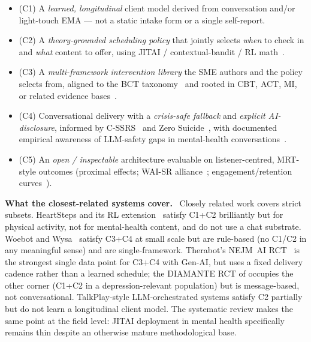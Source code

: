 \documentclass[10pt,conference]{article}
\renewcommand{\paragraph}[1]{\smallskip\par\noindent\textbf{#1}~\ignorespaces}
\begin{document}
\begin{itemize}\setlength{\itemsep}{0pt}
  \item (C1) A \emph{learned, longitudinal} client model derived from
    conversation and/or light-touch EMA --- not a static intake form
    or a single self-report.
  \item (C2) A \emph{theory-grounded scheduling policy} that jointly
    selects \emph{when} to check in and \emph{what} content to offer,
    using JITAI / contextual-bandit / RL
    math~\cite{NahumShani2018JITAI,Klasnja2015MRT,Liao2020PersonalizedHeartSteps}.
  \item (C3) A \emph{multi-framework intervention library} the SME
    authors and the policy selects from, aligned to the BCT
    taxonomy~\cite{Michie2013BCTTaxonomy} and rooted in CBT, ACT, MI,
    or related evidence
    bases~\cite{Hofmann2012CBTMeta,ATjak2015ACTMeta,Lundahl2010MIMeta}.
  \item (C4) Conversational delivery with a \emph{crisis-safe
    fallback} and \emph{explicit AI-disclosure}, informed by
    C-SSRS~\cite{Posner2011CSSRS} and Zero
    Suicide~\cite{Labouliere2018ZeroSuicide}, with documented
    empirical awareness of LLM-safety gaps in mental-health
    conversations~\cite{DeFreitas2024ChatbotSafety,Scholich2025TherapistVsChatbot,Parks2025CriticalEval}.
  \item (C5) An \emph{open / inspectable} architecture evaluable on
    listener-centred, MRT-style outcomes (proximal effects; WAI-SR
    alliance~\cite{Hatcher2006WAISR}; engagement/retention
    curves~\cite{Linardon2020Attrition}).
\end{itemize}

\paragraph{What the closest-related systems cover.}
Closely related work covers strict subsets. HeartSteps and its
RL extension~\cite{Klasnja2018HeartStepsMRT,Liao2020PersonalizedHeartSteps}
satisfy C1+C2 brilliantly but for physical activity, not for
mental-health content, and do not use a chat substrate. Woebot and
Wysa~\cite{Fitzpatrick2017Woebot,Inkster2018Wysa} satisfy C3+C4 at
small scale but are rule-based (no C1/C2 in any meaningful sense)
and are single-framework. Therabot's NEJM~AI
RCT~\cite{Heinz2025TherabotRCT} is the strongest single data point for
C3+C4 with Gen-AI, but uses a fixed delivery cadence rather than a
learned schedule; the DIAMANTE RCT of \cite{Aguilera2024DIAMANTERL}
occupies the other corner (C1+C2 in a depression-relevant population)
but is message-based, not conversational. TalkPlay-style
LLM-orchestrated systems satisfy C2 partially but do not learn a
longitudinal client model. The
\cite{NahumShani2025JITAIMHReview} systematic review makes the same
point at the field level: JITAI deployment in mental health specifically
remains thin despite an otherwise mature methodological base.
\end{document}
